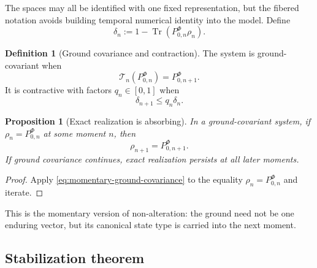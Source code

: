 \documentclass[11pt,reqno]{scrartcl}
\DeclareMathOperator{\Tr}{Tr}
\theoremstyle{plain}
\newtheorem{proposition}[proposition]{Proposition}
\theoremstyle{definition}
\newtheorem{definition}[definition]{Definition}
\theoremstyle{remark}
\begin{document}
The spaces may all be identified with one fixed representation, but the
fibered notation avoids building temporal numerical identity into the model.
Define
\begin{equation}
  \delta_n
  :=1-\Tr(P_{0,n}^{\Phi}\rho_n).
  \label{eq:momentary-ground-deviation}
\end{equation}

\begin{definition}[Ground covariance and contraction]
\label{def:momentary-ground-covariance}
The system is ground-covariant when
\begin{equation}
  \mathcal T_n(P_{0,n}^{\Phi})=P_{0,n+1}^{\Phi}.
  \label{eq:momentary-ground-covariance}
\end{equation}
It is contractive with factors $q_n\in[0,1]$ when
\begin{equation}
  \delta_{n+1}\leq q_n\delta_n.
  \label{eq:momentary-ground-contraction}
\end{equation}
\end{definition}

\begin{proposition}[Exact realization is absorbing]
\label{prop:exact-realization-absorbing}
In a ground-covariant system, if $\rho_n=P_{0,n}^{\Phi}$ at some moment $n$, then
\begin{equation}
  \rho_{n+1}=P_{0,n+1}^{\Phi}.
  \label{eq:rigpa-absorbing-next-moment}
\end{equation}
If ground covariance continues, exact realization persists at all later
moments.
\end{proposition}

\begin{proof}
Apply \eqref{eq:momentary-ground-covariance} to the equality
$\rho_n=P_{0,n}^{\Phi}$ and iterate.
\end{proof}

This is the momentary version of non-alteration: the ground need not be one
enduring vector, but its canonical state type is carried into the next moment.

\subsection{Stabilization theorem}
\end{document}
